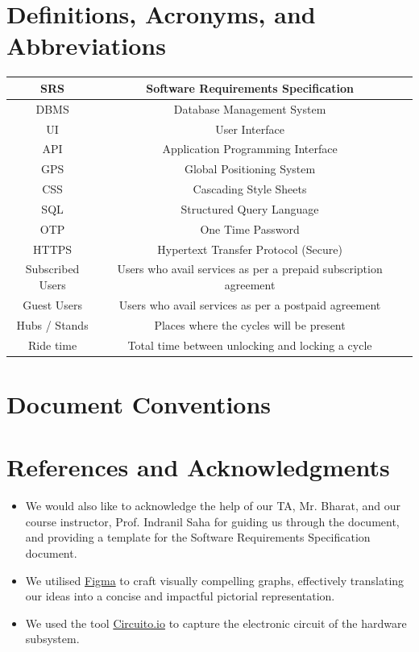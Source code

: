 \documentclass{scrreprt}
\begin{document}
\section{Definitions, Acronyms, and Abbreviations}
\begin{center}
\begin{tabular}{|c|c|p{}}
    \hline
    SRS & Software Requirements Specification \\
    \hline
    DBMS & Database Management System \\
    \hline
    UI & User Interface \\
    \hline
    API & Application Programming Interface \\
    \hline
    GPS & Global Positioning System \\
    \hline
    CSS & Cascading Style Sheets \\
    \hline
    SQL & Structured Query Language \\
    \hline
    OTP & One Time Password \\
    \hline
    HTTPS & Hypertext Transfer Protocol (Secure)\\
    \hline
    Subscribed Users & Users who avail services as per a prepaid subscription agreement \\
    \hline
    Guest Users & Users who avail services as per a postpaid agreement \\
    \hline
    Hubs / Stands & Places where the cycles will be present \\
    \hline
    Ride time & Total time between unlocking and locking a cycle \\
    \hline
\end{tabular}
\end{center}

\section{Document Conventions}

\section{References and Acknowledgments}
\begin{itemize}
    \item We would also like to acknowledge the help of our TA, Mr. Bharat, and our course instructor, Prof. Indranil Saha for guiding us through the document, and providing a template for the Software Requirements Specification document.
    \item We utilised \href{https://www.figma.com/}{Figma} to craft visually compelling graphs, effectively translating our ideas into a concise and impactful pictorial representation.
    \item We used the tool \href{https://www.circuito.io/}{Circuito.io} to capture the electronic circuit of the hardware subsystem.
\end{itemize}
\end{document}
